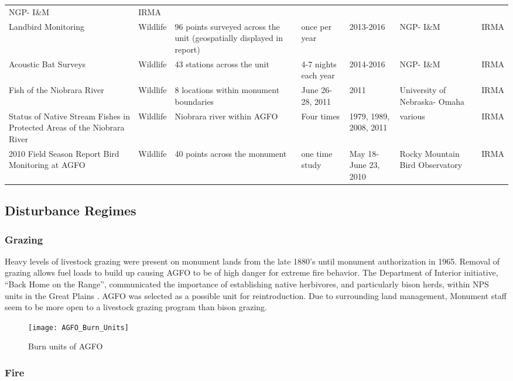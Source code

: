 \begin{longtable}[l]{@{}p{5cm}p{2cm}p{3cm}p{4cm}p{3cm}p{4cm}p{3cm}@{}}
NGP- I\&M & IRMA\tabularnewline
Landbird Monitoring & Wildlife & 96 points surveyed across the unit
(geospatially displayed in report) & once per year & 2013-2016 & NGP-
I\&M & IRMA\tabularnewline
Acoustic Bat Surveys & Wildlife & 43 stations across the unit & 4-7
nights each year & 2014-2016 & NGP- I\&M & IRMA\tabularnewline
Fish of the Niobrara River & Wildlife & 8 locations within monument
boundaries & June 26-28, 2011 & 2011 & University of Nebraska- Omaha &
IRMA\tabularnewline
Status of Native Stream Fishes in Protected Areas of the Niobrara River
& Wildlife & Niobrara river within AGFO & Four times & 1979, 1989, 2008,
2011 & various & IRMA\tabularnewline
2010 Field Season Report Bird Monitoring at AGFO & Wildlife & 40 points
across the monument & one time study & May 18- June 23, 2010 & Rocky
Mountain Bird Observatory & IRMA\tabularnewline
\bottomrule
\end{longtable}
\clearpage
\normalsetting
\pagestyle{fancy} 

\subsection{Disturbance Regimes }

\subsubsection{Grazing }

Heavy levels of livestock grazing were present on monument lands from the late 1880's until monument authorization in 1965. 
Removal of grazing allows fuel loads to build up causing AGFO to be of high danger for extreme fire behavior. 
The Department of Interior initiative, ``Back Home on the Range'', communicated the importance of establishing native herbivores, and particularly bison herds, within NPS units in the Great Plains \citep{hardy2016}. 
AGFO was selected as a possible unit for reintroduction. 
Due to surrounding land management, Monument staff seem to be more open to a livestock grazing program than bison grazing.

\begin{figure}
	\centering
	\texttt{[image: AGFO\_Burn\_Units]}
	\caption{Burn units of AGFO}\label{fig:AGFOBurnUnits}
\end{figure}

\subsubsection{Fire }

